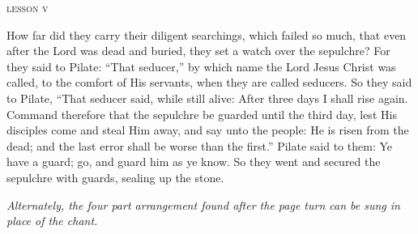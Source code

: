 \bigskip
{
\begin{center}{\textsc{lesson v}}\end{center}

{How far did they carry their diligent searchings, which failed so much, that even after the Lord was dead and buried, they set a watch over the sepulchre?
For they said to Pilate: ``That seducer,'' by which name the Lord Jesus Christ was called, to the comfort of His servants, when they are called seducers. So they said to Pilate, ``That seducer said, while still alive: After three days I shall rise again.
Command therefore that the sepulchre be guarded until the third day, lest His disciples come and steal Him away, and say unto the people: He is risen from the dead; and the last error shall be worse than the first.''
Pilate said to them: Ye have a guard; go, and guard him as ye know. So they went and secured the sepulchre with guards, sealing up the stone.}
}

\bigskip\bigskip

{\myrespsize
\label{o_vos_omnes}
}
{
}

\emph{Alternately, the four part arrangement found after the page turn can be sung in place of the chant.}

